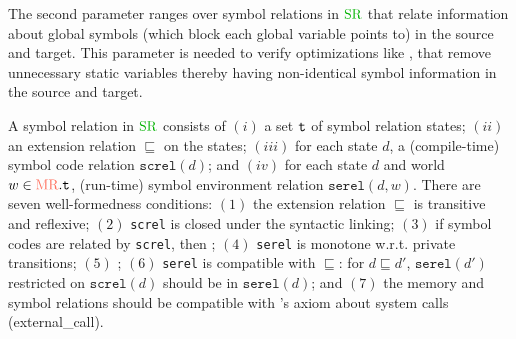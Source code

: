 
The second parameter ranges over symbol relations in $\SREL$ that
relate information about global symbols (\eg which block each global
variable points to) in the source and target.  This parameter is
needed to verify optimizations like ,
 that remove unnecessary static variables thereby
having non-identical symbol information in the source and target.


A symbol relation in $\SREL$ consists of $(i)$ a set $\texttt{t}$ of symbol relation states; $(ii)$ 
an extension relation $\sqsubseteq$ on the states; $(iii)$ for each state $d$,
a (compile-time) symbol code relation $\texttt{screl}(d)$; and $(iv)$ for each state $d$ and world $w \in \MREL.\code{t}$,
(run-time) symbol environment relation $\texttt{serel}(d,w)$.
There are seven well-formedness conditions:
$(1)$ the extension relation $\sqsubseteq$ is transitive and reflexive;
$(2)$ \texttt{screl} is closed under the syntactic linking;
$(3)$ if symbol codes are related by \texttt{screl}, then ;
$(4)$ \texttt{serel} is monotone w.r.t. private transitions;
$(5)$ ;
$(6)$ \texttt{serel} is compatible with $\sqsubseteq$: for $d \sqsubseteq d'$, $\texttt{serel}(d')$ restricted on $\texttt{screl}(d)$ should be in $\texttt{serel}(d)$; and
$(7)$ the memory and symbol relations should be compatible with \cc{}'s axiom about system calls (\ie \textrm{external\_call}).

